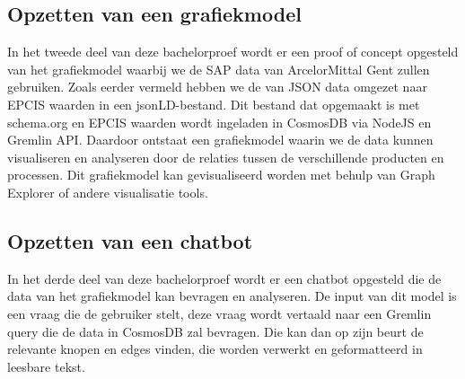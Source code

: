 \subsection{Opzetten van een grafiekmodel}
In het tweede deel van deze bachelorproef wordt er een proof of concept opgesteld van het grafiekmodel waarbij we de SAP data van ArcelorMittal Gent zullen gebruiken.
Zoals eerder vermeld hebben we de van JSON data omgezet naar EPCIS waarden in een jsonLD-bestand. Dit bestand dat opgemaakt is met schema.org en EPCIS waarden wordt ingeladen in CosmosDB via NodeJS en Gremlin API.\@
Daardoor ontstaat een grafiekmodel waarin we de data kunnen visualiseren en analyseren door de relaties tussen de verschillende producten en processen.
Dit grafiekmodel kan gevisualiseerd worden met behulp van Graph Explorer of andere visualisatie tools.


\subsection{Opzetten van een chatbot}
In het derde deel van deze bachelorproef wordt er een chatbot opgesteld die de data van het grafiekmodel kan bevragen en analyseren.
De input van dit model is een vraag die de gebruiker stelt, deze vraag wordt vertaald naar een Gremlin query die de data in CosmosDB zal bevragen.
Die kan dan op zijn beurt de relevante knopen en edges vinden, die worden verwerkt en geformatteerd in leesbare tekst.

